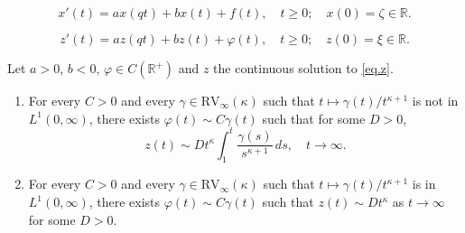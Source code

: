 \documentclass[10pt,a4paper]{amsart}
\begin{document}
	\begin{equation} \label{eq.forced}
		x'(t)=ax(qt)+bx(t)+f(t), \quad t\geq 0; \quad x(0)=\zeta\in \mathbb{R}.
	\end{equation}

		\begin{equation} \label{eq.z}
			z'(t)=az(qt)+bz(t)+\varphi(t),\quad t\geq 0; \quad z(0)=\xi\in\mathbb{R}.
		\end{equation}

	\begin{theorem} \label{thm.growthbdssharp}
		Let $a>0$, $b<0$, $\varphi\in C(\mathbb{R}^+)$ and $z$ the continuous solution to \eqref{eq.z}.
		\begin{enumerate}
			\item[(a)] For every $C>0$ and every  $\gamma\in \text{RV}_\infty(\kappa)$ such that $t\mapsto \gamma(t)/t^{\kappa+1}$ is not in $L^1(0,\infty)$, there exists $\varphi(t)\sim C\gamma(t)$ such that for some $D>0$,
			\[
			z(t)\sim Dt^\kappa\int_1^t \frac{\gamma(s)}{s^{\kappa+1}}\,ds, \quad t\to\infty.
			\] 
			\item[(b)] For every $C>0$ and every  $\gamma\in \text{RV}_\infty(\kappa)$ such that $t\mapsto \gamma(t)/t^{\kappa+1}$ is in $L^1(0,\infty)$, there exists $\varphi(t)\sim C\gamma(t)$ such that $z(t)\sim Dt^\kappa$ as $t\to\infty$ 
			for some $D>0$.
		\end{enumerate}
	\end{theorem}  
\end{document}
